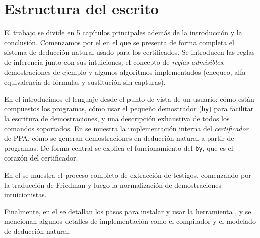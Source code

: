 \section{Estructura del escrito}

El trabajo se divide en 5 capítulos principales además de la introducción y la conclusión. Comenzamos por el  en el que se presenta de forma completa el sistema de deducción natural usado para los certificados. Se introducen las reglas de inferencia junto con sus intuiciones, el concepto de \textit{reglas admisibles}, demostraciones de ejemplo y algunos algoritmos implementados (chequeo, alfa equivalencia de fórmulas y sustitución sin capturas).

En el  introducimos el lenguaje desde el punto de vista de un usuario: cómo están compuestos los programas, cómo usar el pequeño demostrador (\lstinline{by}) para facilitar la escritura de demostraciones, y una descripción exhaustiva de todos los comandos soportados. En  se muestra la implementación interna del \textit{certificador} de PPA, cómo se generan demostraciones en deducción natural a partir de programas. De forma central se explica el funcionamiento del \lstinline{by}, que es el corazón del certificador.

En el  se muestra el proceso completo de extracción de testigos, comenzando por la traducción de Friedman y luego la normalización de demostraciones intuicionistas.

Finalmente, en el  se detallan los pasos para instalar y usar la herramienta \ppaTool{}, y se mencionan algunos detalles de implementación como el compilador y el modelado de deducción natural.